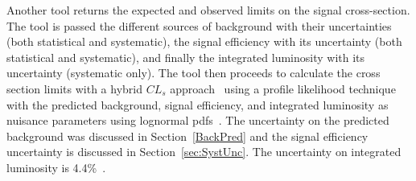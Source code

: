 Another tool returns the expected and observed limits on the signal cross-section. The tool is passed the different sources of background with their uncertainties
(both statistical and systematic), the signal efficiency with its uncertainty (both statistical and systematic),
and finally the integrated luminosity with its uncertainty (systematic only). The tool then proceeds to calculate the cross section limits with
a hybrid $CL_s$ approach~\cite{Read:451614} using a profile likelihood technique~\cite{Cowan:2010js} with the predicted background, signal efficiency, and integrated luminosity
as nuisance parameters using lognormal pdfs~\cite{Eadie,James}. The uncertainty on the predicted background was discussed in Section~\ref{BackPred} and the
signal efficiency uncertainty is discussed in Section~\ref{sec:SystUnc}. The uncertainty on integrated luminosity is 4.4\%~\cite{SMP-12-008}.